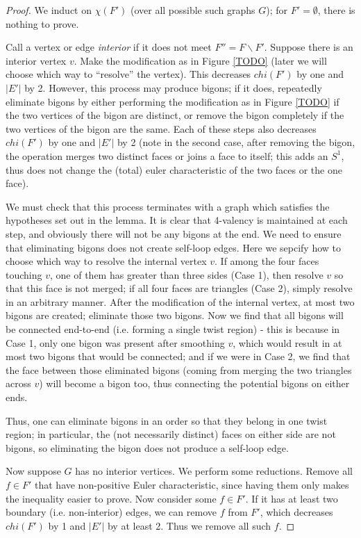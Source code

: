 \documentclass[11pt]{amsart}
\newcommand{\figref}[1]{Figure \ref{#1}}
\theoremstyle{plain}
\theoremstyle{definition}
\begin{document}
\begin{proof}
We induct on $\chi(F')$ (over all possible such graphs $G$);
for $F' = \emptyset$, there is nothing to prove.

Call a vertex or edge \emph{interior} if it does not meet
$F'' = F \backslash F'$.
Suppose there is an interior vertex $v$.
Make the modification as in \figref{TODO}
(later we will choose which way to ``resolve'' the vertex).
This decreases $chi(F')$ by one and $|E'|$ by 2.
However, this process may produce bigons;
if it does, repeatedly eliminate bigons by either
performing the modification as in \figref{TODO}
if the two vertices of the bigon are distinct,
or remove the bigon completely if the two vertices
of the bigon are the same.
Each of these steps also decreases $chi(F')$ by one and $|E'|$ by 2
(note in the second case, after removing the bigon,
the operation merges two distinct faces or joins a face to itself;
this adds an $S^1$, thus does not change the (total) euler characteristic
of the two faces or the one face).


We must check that this process terminates with a graph
which satisfies the hypotheses set out in the lemma.
It is clear that %
4-valency is maintained
at each step, and obviously there will not be any bigons at the end.
We need to ensure that eliminating bigons does not
create self-loop edges.
Here we sepcify how to choose which way to resolve the internal
vertex $v$. If among the four faces touching $v$,
one of them has greater than three sides (Case 1),
then resolve $v$ so that this face is not merged;
if all four faces are triangles (Case 2),
simply resolve in an arbitrary manner.
After the modification of the internal vertex,
at most two bigons are created;
eliminate those two bigons.
Now we find that all bigons will be connected end-to-end
(i.e. forming a single twist region) -
this is because in Case 1, only one bigon was present after smoothing
$v$, which would result in at most two bigons that would be connected;
and if we were in Case 2, we find that the face between those
eliminated bigons (coming from merging the two triangles across $v$)
will become a bigon too,
thus connecting the potential bigons on either ends.

Thus, one can eliminate bigons in an order so that
they belong in one twist region;
in particular, the (not necessarily distinct) faces on either side
are not bigons,
so eliminating the bigon does not produce a self-loop edge.


Now suppose $G$ has no interior vertices.
We perform some reductions.
Remove all $f\in F'$ that have non-positive Euler characteristic,
since having them only makes the inequality easier to prove.
Now consider some $f\in F'$.
If it has at least two boundary (i.e. non-interior) edges,
we can remove $f$ from $F'$,
which decreases $chi(F')$ by 1 and $|E'|$ by at least 2.
Thus we remove all such $f$.



\end{proof}
\end{document}
